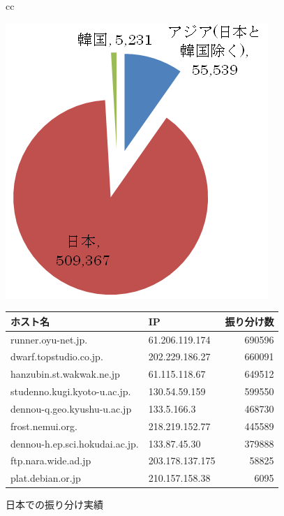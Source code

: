 \documentclass[mingoth,a4paper]{jsarticle}
\begin{document}
\newpage

\begin{figure}[!h]
 \begin{tabular}{cc}
  \begin{minipage}{0.3\hsize}
   \begin{center}
    \includegraphics[width=0.8\hsize]{image200810/cdn-area-asia.png}
    \caption{アジア地域の振り分け実績}
    \label{fig:cdn-area-asia}
   \end{center}
  \end{minipage}
  \begin{minipage}{0.7\hsize}
   \begin{center}
    \caption{日本での振り分け実績}
    \begin{tabular}{|l|l|r|}
     \hline
     \textbf{ホスト名} & \textbf{IP} & \multicolumn{1}{l|}{\textbf{振り分け数}} \\ \hline
     runner.oyu-net.jp. & 61.206.119.174 & 690596 \\ \hline
     dwarf.topstudio.co.jp. & 202.229.186.27 & 660091 \\ \hline
     hanzubin.st.wakwak.ne.jp & 61.115.118.67 & 649512 \\ \hline
     studenno.kugi.kyoto-u.ac.jp. & 130.54.59.159 & 599550 \\ \hline
     dennou-q.geo.kyushu-u.ac.jp & 133.5.166.3 & 468730 \\ \hline
     frost.nemui.org. & 218.219.152.77 & 445589 \\ \hline
     dennou-h.ep.sci.hokudai.ac.jp. & 133.87.45.30 & 379888 \\ \hline
     ftp.nara.wide.ad.jp & 203.178.137.175 & 58825 \\ \hline
     plat.debian.or.jp & 210.157.158.38 & 6095 \\ \hline
    \end{tabular} 
   \end{center}
   \label{dnsjapansymmetry}
  \end{minipage}
 \end{tabular}
\end{figure}
\end{document}
